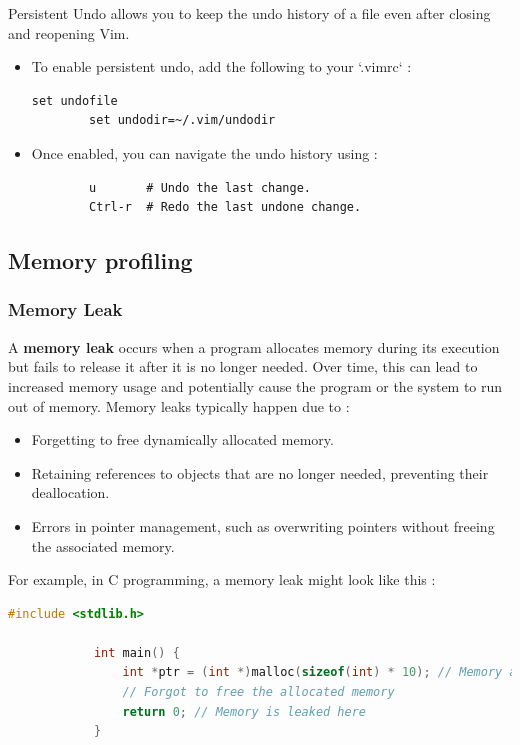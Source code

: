\documentclass[12pt]{article}
\begin{document}
    Persistent Undo allows you to keep the undo history of a file even after closing and reopening Vim.

    \begin{itemize}
        \item To enable persistent undo, add the following to your `.vimrc` :
        \begin{lstlisting}[language=vim]
        set undofile
        set undodir=~/.vim/undodir
        \end{lstlisting}
        \item Once enabled, you can navigate the undo history using :
        \begin{lstlisting}
        u       # Undo the last change.
        Ctrl-r  # Redo the last undone change.
        \end{lstlisting}
    \end{itemize}



    \subsection{Memory profiling}
        \subsubsection{Memory Leak}

            A \textbf{memory leak} occurs when a program allocates memory during its execution but fails to release it after it is no longer needed. Over time, this can lead to increased memory usage and potentially cause the program or the system to run out of memory. Memory leaks typically happen due to :

            \begin{itemize}
                \item Forgetting to free dynamically allocated memory.
                \item Retaining references to objects that are no longer needed, preventing their deallocation.
                \item Errors in pointer management, such as overwriting pointers without freeing the associated memory.
            \end{itemize}
            
            For example, in C programming, a memory leak might look like this :
            \begin{lstlisting}[language=c]
            #include <stdlib.h>
            
            int main() {
                int *ptr = (int *)malloc(sizeof(int) * 10); // Memory allocated
                // Forgot to free the allocated memory
                return 0; // Memory is leaked here
            }
            \end{lstlisting}
            
\end{document}
